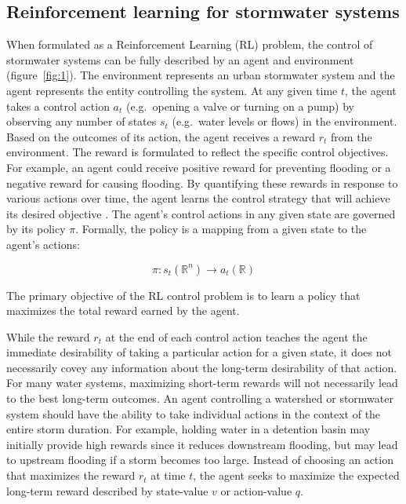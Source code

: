 \subsection{\textbf{Reinforcement learning for stormwater systems}}
When formulated as a Reinforcement Learning (RL) problem, the control of stormwater systems can be fully described by an agent and environment (figure~\ref{fig:1}).
The environment represents an urban stormwater system and the agent represents the entity controlling the system.
At any given time $t$, the agent takes a control action $a_t$ (e.g.\ opening a valve or turning on a pump) by observing any number of states $s_t$ (e.g.\ water levels or flows) in the environment.
Based on the outcomes of its action, the agent receives a reward $r_t$ from the environment.
The reward is formulated to reflect the specific control objectives.
For example, an agent could receive positive reward for preventing flooding or a negative reward for causing flooding.
By quantifying these rewards in response to various actions over time, the agent learns the control strategy that will achieve its desired objective \cite{Sutton98}.
The agent's control actions in any given state are governed by its policy $\pi$. Formally, the policy is a mapping from a given state to the agent’s actions:

\begin{equation}
    \pi :s_t (\mathbb{R}^n ) \rightarrow a_t (\mathbb{R})
\end{equation}

The primary objective of the RL control problem is to learn a policy that maximizes the total reward earned by the agent.

While the reward $r_t$ at the end of each control action teaches the agent the immediate desirability of taking a particular action for a given state, it does not necessarily covey any information about the long-term desirability of that action.
For many water systems, maximizing short-term rewards will not necessarily lead to the best long-term outcomes.
An agent controlling a watershed or stormwater system should have the ability to take individual actions in the context of the entire storm duration.
For example, holding water in a detention basin may initially provide high rewards since it reduces downstream flooding, but may lead to upstream flooding if a storm becomes too large.
Instead of choosing an action that maximizes the reward $r_t$  at time $t$, the agent seeks to maximize the expected long-term reward described by state-value $v$ or action-value $q$.

